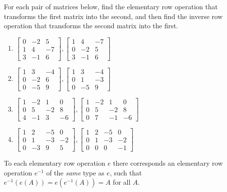\documentclass[12pt,letterpaper,reqno]{article}
\numberwithin{equation}{section}
\begin{document}
\begin{exercise}
For each pair of matrices below, find the elementary row operation that transforms the first matrix into the second, and then find the inverse row operation that transforms the second matrix into the first.
	\begin{enumerate}
		\item $\begin{bmatrix}
			0&-2&5 \\ 1&4&-7 \\ 3&-1&6
		\end{bmatrix}, \begin{bmatrix}
			1&4&-7 \\ 0&-2&5 \\ 3&-1&6
		\end{bmatrix}$
		\item $\begin{bmatrix}
			1&3&-4 \\ 0&-2&6 \\ 0&-5&9
		\end{bmatrix}, \begin{bmatrix}
			1&3&-4 \\ 0&1&-3 \\ 0&-5&9
		\end{bmatrix}$
		\item $\begin{bmatrix}
			1&-2&1&0 \\ 0&5&-2&8 \\ 4&-1&3&-6
		\end{bmatrix}, \begin{bmatrix}
			1&-2&1&0 \\0&5&-2&8 \\ 0&7&-1&-6
		\end{bmatrix}$
		\item $\begin{bmatrix}
			1&2&-5&0 \\ 0&1&-3&-2 \\ 0&-3&9&5
		\end{bmatrix}, \begin{bmatrix}
			1&2&-5&0 \\ 0&1&-3&-2 \\ 0&0&0&-1
		\end{bmatrix}$
	\end{enumerate}	
\end{exercise}


\begin{thm}\label{thm:elementary_row_operations_are_invertible}
	To each elementary row operation $e$ there corresponds an elementary row operation $e^{-1}$ of the \emph{same} type as $e$, such that $e^{-1}(e(A))=e(e^{-1}(A))=A$ for all $A$.
\end{thm}
\end{document}
